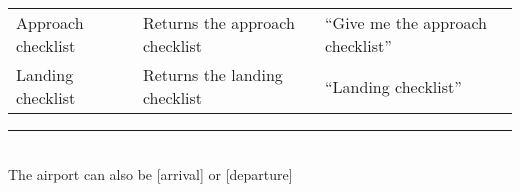 \begin{table}[!h]
\begin{tabular}{|p{0.2\paperwidth}|p{0.5\paperwidth}|p{0.4\paperwidth}|}
\rowcolor{lightgray} \multicolumn{3}{|l|}{Checklists} \\ \hline
Approach checklist & Returns the approach checklist & ``Give me the approach checklist''  \\ 
\hline 
Landing checklist  & Returns the landing checklist & ``Landing checklist''  \\ 
\hline 
\end{tabular}

\end{table}

\noindent\rule{8cm}{0.4pt} \\
{\footnotesize * The airport can also be [arrival] or [departure]}
